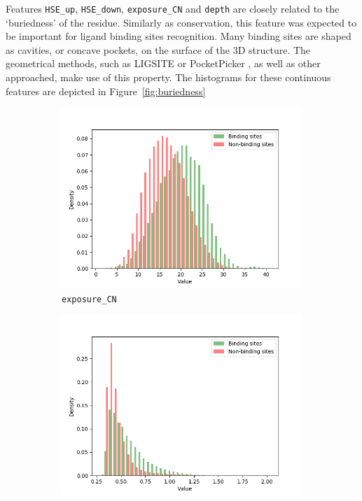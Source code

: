 Features \texttt{HSE\_up}, \texttt{HSE\_down}, \texttt{exposure\_CN} and \texttt{depth} are closely related to the `buriedness' of the residue. Similarly as conservation, this feature was expected to be important for ligand binding sites recognition. Many binding sites are shaped as cavities, or concave pockets, on the surface of the 3D structure. The geometrical methods, such as LIGSITE \cite{ligsite} or PocketPicker \cite{pocketpicker}, as well as other approached, make use of this property. The histograms for these continuous features are depicted in Figure~\ref{fig:buriedness}


\begin{figure}[!htbp]
\centering
\begin{subfigure}{.5\textwidth}
  \centering
  \includegraphics[width=1\linewidth]{../img/exposure_CN_hist.png}
  \caption{\texttt{exposure\_CN}}
\end{subfigure}%
\begin{subfigure}{.5\textwidth}
  \centering
  \includegraphics[width=1\linewidth]{../img/depth_hist.png}

\end{subfigure}
\end{figure}
